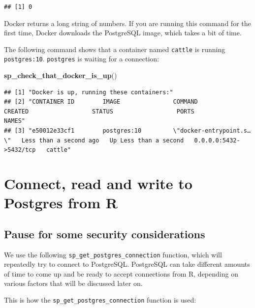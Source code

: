 \documentclass[]{book}
\newenvironment{Shaded}{\begin{snugshade}}{\end{snugshade}}
\newcommand{\KeywordTok}[1]{\textcolor[rgb]{0.13,0.29,0.53}{\textbf{#1}}}
\newcommand{\NormalTok}[1]{#1}
\theoremstyle{definition}
\theoremstyle{definition}
\theoremstyle{definition}
\theoremstyle{remark}
\begin{document}
\begin{verbatim}
## [1] 0
\end{verbatim}

Docker returns a long string of numbers. If you are running this command
for the first time, Docker downloads the PostgreSQL image, which takes a
bit of time.

The following command shows that a container named \texttt{cattle} is
running \texttt{postgres:10}. \texttt{postgres} is waiting for a
connection:

\begin{Shaded}
\begin{Highlighting}[]
\KeywordTok{sp_check_that_docker_is_up}\NormalTok{()}
\end{Highlighting}
\end{Shaded}

\begin{verbatim}
## [1] "Docker is up, running these containers:"                                                                                                            
## [2] "CONTAINER ID        IMAGE               COMMAND                  CREATED                  STATUS                  PORTS                    NAMES"   
## [3] "e50012e33cf1        postgres:10         \"docker-entrypoint.s…\"   Less than a second ago   Up Less than a second   0.0.0.0:5432->5432/tcp   cattle"
\end{verbatim}

\hypertarget{connect-read-and-write-to-postgres-from-r}{%
\section{Connect, read and write to Postgres from
R}\label{connect-read-and-write-to-postgres-from-r}}

\hypertarget{pause-for-some-security-considerations}{%
\subsection{Pause for some security
considerations}\label{pause-for-some-security-considerations}}

We use the following \texttt{sp\_get\_postgres\_connection} function,
which will repeatedly try to connect to PostgreSQL. PostgreSQL can take
different amounts of time to come up and be ready to accept connections
from R, depending on various factors that will be discussed later on.

This is how the \texttt{sp\_get\_postgres\_connection} function is used:
\end{document}
